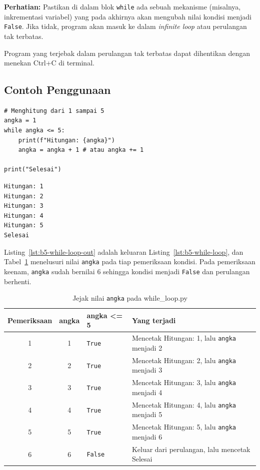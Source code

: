 \textbf{Perhatian:} Pastikan di dalam blok \texttt{while} ada sebuah mekanisme (misalnya, inkrementasi variabel) yang pada akhirnya akan mengubah nilai kondisi menjadi \texttt{False}. Jika tidak, program akan masuk ke dalam \textit{infinite loop} atau perulangan tak terbatas.

Program yang terjebak dalam perulangan tak terbatas dapat dihentikan dengan menekan Ctrl+C di terminal.

\subsection{Contoh Penggunaan}
\begin{lstlisting}[style=PythonStyle, caption={Kode Python: while_loop.py}, label={lst:b5-while-loop}]
# Menghitung dari 1 sampai 5
angka = 1
while angka <= 5:
    print(f"Hitungan: {angka}")
    angka = angka + 1 # atau angka += 1

print("Selesai")
\end{lstlisting}

\begin{lstlisting}[language=bash, caption={Keluaran while_loop.py}, label={lst:b5-while-loop-out}]
Hitungan: 1
Hitungan: 2
Hitungan: 3
Hitungan: 4
Hitungan: 5
Selesai
\end{lstlisting}

Listing~\ref{lst:b5-while-loop-out} adalah keluaran Listing~\ref{lst:b5-while-loop}, dan Tabel~\ref{tab:b5-jejak-while} menelusuri nilai \texttt{angka} pada tiap pemeriksaan kondisi. Pada pemeriksaan keenam, \texttt{angka} sudah bernilai 6 sehingga kondisi menjadi \texttt{False} dan perulangan berhenti.

\begin{table}[H]
  \centering
  \caption{Jejak nilai \texttt{angka} pada while_loop.py}
  \label{tab:b5-jejak-while}
  \begin{tabularx}{\textwidth}{cclX}
    \hline
    \textbf{Pemeriksaan} & \textbf{angka} & \textbf{angka <= 5} & \textbf{Yang terjadi} \\
    \hline
    1 & 1 & \texttt{True} & Mencetak Hitungan: 1, lalu \texttt{angka} menjadi 2 \\
    \hline
    2 & 2 & \texttt{True} & Mencetak Hitungan: 2, lalu \texttt{angka} menjadi 3 \\
    \hline
    3 & 3 & \texttt{True} & Mencetak Hitungan: 3, lalu \texttt{angka} menjadi 4 \\
    \hline
    4 & 4 & \texttt{True} & Mencetak Hitungan: 4, lalu \texttt{angka} menjadi 5 \\
    \hline
    5 & 5 & \texttt{True} & Mencetak Hitungan: 5, lalu \texttt{angka} menjadi 6 \\
    \hline
    6 & 6 & \texttt{False} & Keluar dari perulangan, lalu mencetak Selesai \\
    \hline
  \end{tabularx}
\end{table}

